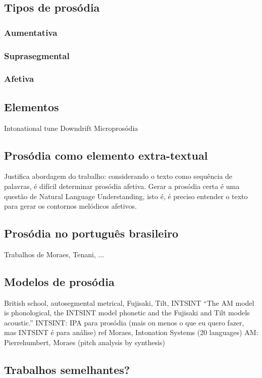 \subsection{Tipos de prosódia}
\subsubsection{Aumentativa}
\subsubsection{Suprasegmental}
\subsubsection{Afetiva}
\subsection{Elementos}
Intonational tune
Downdrift
Microprosódia
\subsection{Prosódia como elemento extra-textual}
Justifica abordagem do trabalho: considerando o texto como sequência de
palavras, é difícil determinar prosódia afetiva. Gerar a prosódia certa é uma
questão de Natural Language Understanding, isto é, é preciso entender o texto
para gerar os contornos melódicos afetivos.
\subsection{Prosódia no português brasileiro}
Trabalhos de Moraes, Tenani, ...
\subsection{Modelos de prosódia}
British school, autosegmental metrical, Fujisaki, Tilt, INTSINT
``The AM model is phonological, the INTSINT model phonetic and the Fujisaki and Tilt models acoustic.''
INTSINT: IPA para prosódia (mais ou menos o que eu quero fazer, mas INTSINT é
para análise)
ref Moraes, Intonation Systems (20 languages)
AM: Pierrehumbert, Moraes (pitch analysis by synthesis)
\subsection{Trabalhos semelhantes?}
